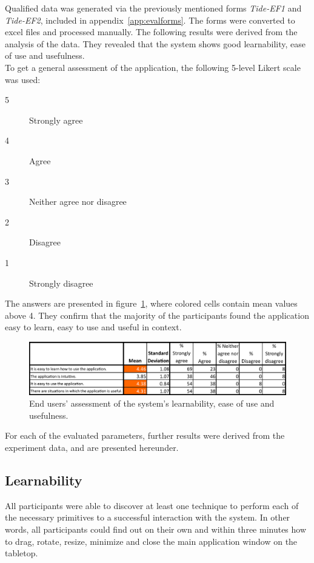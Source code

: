 Qualified data was generated via the previously mentioned forms \emph{Tide-EF1} and \emph{Tide-EF2}, included in appendix~\ref{app:evalforms}.
The forms were converted to excel files and processed manually.
The following results were derived from the analysis of the data.
They revealed that the system shows good learnability, ease of use and usefulness.
\\
\linebreak
To get a general assessment of the application, the following 5-level Likert scale was used:
\begin{tightlists}
\begin{description}
\item[5] Strongly agree
\item[4] Agree
\item[3] Neither agree nor disagree
\item[2] Disagree
\item[1] Strongly disagree
\end{description}
\end{tightlists}
The answers are presented in figure~\ref{fig:evalagree}, where colored cells contain mean values above 4.
They confirm that the majority of the participants found the application easy to learn, easy to use and useful in context.

\begin{figure}[htb]
  \centering
    \includegraphics[width=1\textwidth]{images/evalagree}
    \caption{End users' assessment of the system's learnability, ease of use and usefulness.}
    \label{fig:evalagree}
\end{figure}

For each of the evaluated parameters, further results were derived from the experiment data, and are presented hereunder.

\subsection{Learnability}

All participants were able to discover at least one technique to perform each of the necessary primitives to a successful interaction with the system.
In other words, all participants could find out on their own and within three minutes how to drag, rotate, resize, minimize and close the main application window on the tabletop.

